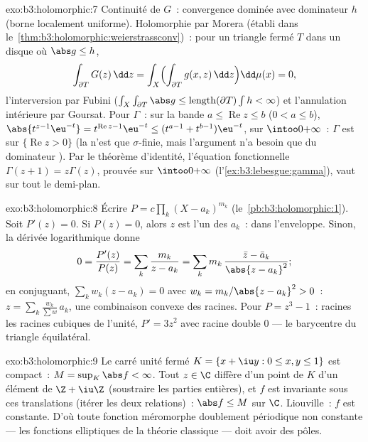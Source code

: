 \begin{solution}{exo:b3:holomorphic:7}
Continuité de $G$~: convergence dominée avec dominateur $h$
(borne localement uniforme). Holomorphie par Morera (établi
dans le~\cref{thm:b3:holomorphic:weierstrassconv})~: pour un
triangle fermé $T$ dans un disque où $\abs g \leq h$,
\[
\int_{\partial T}G(z)\,\dd z =
\int_X\Bigl(\int_{\partial T}g(x, z)\,\dd z\Bigr)\dd\mu(x) =
0,
\]
l'interversion par Fubini ($\int_X\int_{\partial T}\abs g
\leq \operatorname{length}(\partial T)\int h < \infty$) et
l'annulation intérieure par Goursat. Pour $\Gamma$~: sur la
bande $a \leq \operatorname{Re}z \leq b$ ($0 < a \leq b$),
$\abs{t^{z-1}\eu^{-t}} = t^{\operatorname{Re}z-1}\eu^{-t}
\leq (t^{a-1} + t^{b-1})\eu^{-t}$,  sur
$\intoo0{+\infty}$~: $\Gamma$ est  sur
$\{\operatorname{Re} z > 0\}$ (la  n'est que
$\sigma$-finie, mais l'argument n'a besoin que du
dominateur ). Par le théorème d'identité,
l'équation fonctionnelle $\Gamma(z + 1) = z\Gamma(z)$,
prouvée sur $\intoo0{+\infty}$
(l'\cref{ex:b3:lebesgue:gamma}), vaut sur tout le demi-plan.
\end{solution}

\begin{solution}{exo:b3:holomorphic:8}
Écrire $P = c\prod_k(X - a_k)^{m_k}$
(le~\cref{pb:b3:holomorphic:1}). Soit $P'(z) = 0$. Si $P(z)
= 0$, alors $z$ est l'un des $a_k$~: dans l'enveloppe. Sinon,
la dérivée logarithmique donne
\[
0 = \frac{P'(z)}{P(z)} = \sum_k\frac{m_k}{z - a_k}
= \sum_k m_k\,\frac{\bar z - \bar a_k}{\abs{z - a_k}^2} ;
\]
en conjuguant, $\sum_kw_k(z - a_k) = 0$ avec $w_k =
m_k/\abs{z - a_k}^2 > 0$~: $z = \sum_k\frac{w_k}{\sum
w}\,a_k$, une combinaison convexe des racines. Pour $P =
z^3 - 1$~: racines les racines cubiques de l'unité, $P' =
3z^2$ avec racine double $0$ --- le barycentre du triangle
équilatéral.
\end{solution}

\begin{solution}{exo:b3:holomorphic:9}
Le carré unité fermé $K = \{x + \iu y : 0 \leq x, y \leq 1\}$
est compact~: $M = \sup_K\abs f < \infty$. Tout $z \in \C$
diffère d'un point de $K$ d'un élément de $\Z + \iu\Z$
(soustraire les parties entières), et $f$ est invariante sous
ces translations (itérer les deux relations)~: $\abs f \leq
M$ sur $\C$. Liouville~: $f$ est constante. D'où toute
fonction méromorphe doublement périodique non constante ---
les fonctions elliptiques de la théorie classique --- doit
avoir des pôles.
\end{solution}

